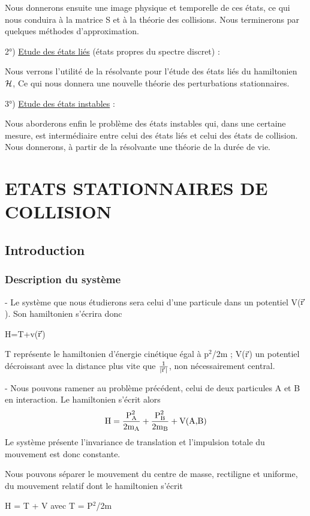 Nous donnerons ensuite une image physique et temporelle de ces
états, ce qui nous conduira à la matrice S et à la théorie des collisions.
Nous terminerons par quelques méthodes d'approximation.

2°) \ul{Etude des états liés} (états propres du spectre discret) :

Nous verrons l'utilité de la résolvante pour l'étude des états
liés du hamiltonien $\mathcal{H}$, Ce qui nous donnera une nouvelle théorie des perturbations stationnaires.

3°) \ul{Etude des états instables} :

Nous aborderons enfin le problème des états instables qui, dans
une certaine mesure, est intermédiaire entre celui des états liés et celui
des états de collision. Nous donnerons, à partir de la résolvante une théorie de la durée de vie.

\chapter{ETATS STATIONNAIRES DE COLLISION}%
\section{Introduction}%
\subsection{Description du système}%

- Le système que nous étudierons sera celui d'une particule
dans un potentiel V($\vec{\text{r}}$). Son hamiltonien s'écrira donc
\begin{center}
H=T+v($\vec{\text{r}}$)
\end{center}
T représente le hamiltonien d'énergie cinétique égal à p$^2$/2m ;
V($\vec{\text{r}}$) un potentiel décroissant avec la distance plus vite que $\frac{1}{|\vec{\text{r}}\,|}$,
non nécessairement central.

- Nous pouvons ramener au problème précédent, celui de deux
particules A et B en interaction. Le hamiltonien s'écrit alors
\[
\text{H} = \frac{\text{P}_{\text{A}}^2}{2\text{m}_{\text{A}}} + \frac{\text{P}_{\text{B}}^2}{2\text{m}_{\text{B}}} + \text{V(A,B)}
\]
Le système présente l'invariance de translation et l'impulsion totale du
mouvement est donc constante.

Nous pouvons séparer le mouvement du centre de masse, rectiligne et uniforme,
du mouvement relatif dont le hamiltonien s'écrit
\begin{center}
H = T + V \hspace{2cm} avec \hspace{1cm} T = P$^2$/2m
\end{center}

